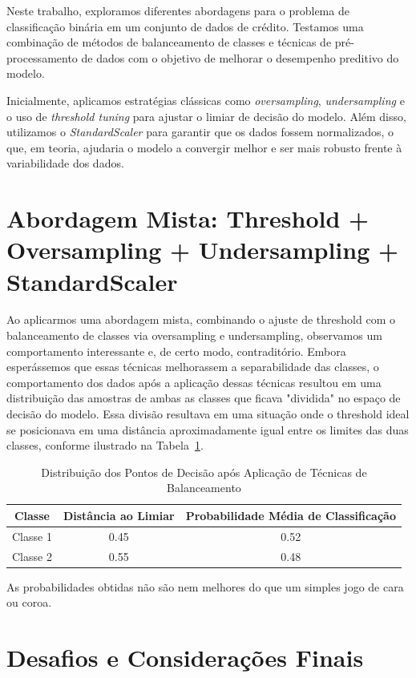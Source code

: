 \documentclass{abntpuc}
\begin{document}
Neste trabalho, exploramos diferentes abordagens para o problema de classificação binária em um conjunto de dados de crédito. Testamos uma combinação de métodos de balanceamento de classes e técnicas de pré-processamento de dados com o objetivo de melhorar o desempenho preditivo do modelo.

Inicialmente, aplicamos estratégias clássicas como \textit{oversampling}, \textit{undersampling} e o uso de \textit{threshold tuning} para ajustar o limiar de decisão do modelo. Além disso, utilizamos o \textit{StandardScaler} para garantir que os dados fossem normalizados, o que, em teoria, ajudaria o modelo a convergir melhor e ser mais robusto frente à variabilidade dos dados.

\section{Abordagem Mista: Threshold + Oversampling + Undersampling + StandardScaler}

Ao aplicarmos uma abordagem mista, combinando o ajuste de threshold com o balanceamento de classes via oversampling e undersampling, observamos um comportamento interessante e, de certo modo, contraditório. Embora esperássemos que essas técnicas melhorassem a separabilidade das classes, o comportamento dos dados após a aplicação dessas técnicas resultou em uma distribuição das amostras de ambas as classes que ficava "dividida" no espaço de decisão do modelo. Essa divisão resultava em uma situação onde o threshold ideal se posicionava em uma distância aproximadamente igual entre os limites das duas classes, conforme ilustrado na Tabela~\ref{tab:threshold}.

\begin{table}[H]
\centering
\caption{Distribuição dos Pontos de Decisão após Aplicação de Técnicas de Balanceamento}
\begin{tabular}{|c|c|c|}
\hline
Classe & Distância ao Limiar & Probabilidade Média de Classificação \\ \hline
Classe 1 & 0.45 & 0.52 \\ \hline
Classe 2 & 0.55 & 0.48 \\ \hline
\end{tabular}
\label{tab:threshold}
\end{table}

As probabilidades obtidas não são nem melhores do que um simples jogo de cara ou coroa.

\section{Desafios e Considerações Finais}
\end{document}
